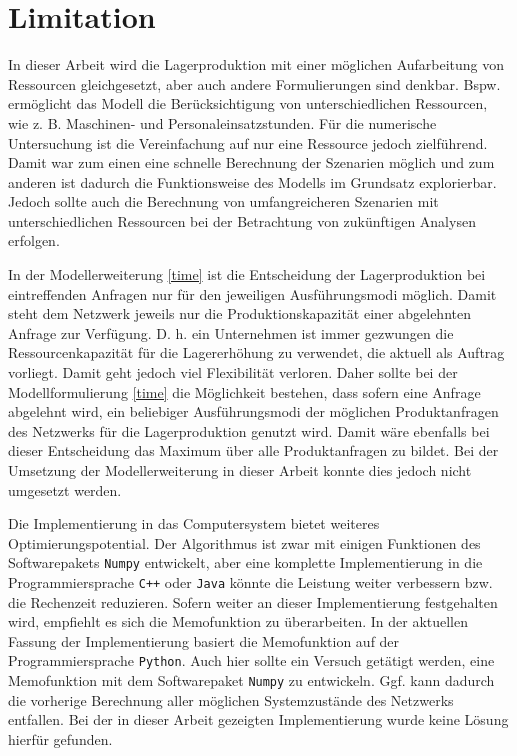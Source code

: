 \section*{Limitation}

In dieser Arbeit wird die Lagerproduktion mit einer möglichen Aufarbeitung von Ressourcen gleichgesetzt, aber auch andere Formulierungen sind denkbar. Bspw. ermöglicht das Modell die Berücksichtigung von unterschiedlichen Ressourcen, wie z. B. Maschinen- und Personaleinsatzstunden. Für die numerische Untersuchung ist die Vereinfachung auf nur eine Ressource jedoch zielführend. Damit war zum einen eine schnelle Berechnung der Szenarien möglich und zum anderen ist dadurch die Funktionsweise des Modells im Grundsatz explorierbar. Jedoch sollte auch die Berechnung von umfangreicheren Szenarien mit unterschiedlichen Ressourcen bei der Betrachtung von zukünftigen Analysen erfolgen.

In der Modellerweiterung \eqref{time} ist die Entscheidung der Lagerproduktion bei eintreffenden Anfragen nur für den jeweiligen Ausführungsmodi möglich. Damit steht dem Netzwerk jeweils nur die Produktionskapazität einer abgelehnten Anfrage zur Verfügung. D. h. ein Unternehmen ist immer gezwungen die Ressourcenkapazität für die Lagererhöhung zu verwendet, die aktuell als Auftrag vorliegt. Damit geht jedoch viel Flexibilität verloren. Daher sollte bei der Modellformulierung \eqref{time} die Möglichkeit bestehen, dass sofern eine Anfrage abgelehnt wird, ein beliebiger Ausführungsmodi der möglichen Produktanfragen des Netzwerks für die Lagerproduktion genutzt wird. Damit wäre ebenfalls bei dieser Entscheidung das Maximum über alle Produktanfragen zu bildet. Bei der Umsetzung der Modellerweiterung in dieser Arbeit konnte dies jedoch nicht umgesetzt werden.

Die Implementierung in das Computersystem bietet weiteres Optimierungspotential. Der Algorithmus ist zwar mit einigen Funktionen des Softwarepakets \texttt{Numpy} entwickelt, aber eine komplette Implementierung in die Programmiersprache \texttt{C++} oder \texttt{Java} könnte die Leistung weiter verbessern bzw. die Rechenzeit reduzieren. Sofern weiter an dieser Implementierung festgehalten wird, empfiehlt es sich die Memofunktion zu überarbeiten. In der aktuellen Fassung der Implementierung basiert die Memofunktion auf der Programmiersprache \texttt{Python}. Auch hier sollte ein Versuch getätigt werden, eine Memofunktion mit dem Softwarepaket \texttt{Numpy} zu entwickeln. Ggf. kann dadurch die vorherige Berechnung aller möglichen Systemzustände des Netzwerks entfallen. Bei der in dieser Arbeit gezeigten Implementierung wurde keine Lösung hierfür gefunden.


